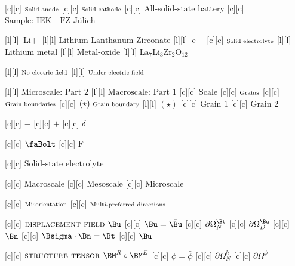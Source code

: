 [c][c] {$\text{\scriptsize Solid anode}$}
[c][c] {$\text{\scriptsize Solid cathode}$}
[c][c] {$\text{All-solid-state battery}$}
[c][c] {$\text{Sample: IEK - FZ Jülich}$}

[l][l] {$\text{Li}+$}
[l][l] {$\text{Lithium Lanthanum Zirconate}$}
[l][l] {$\text{e}-$}
[c][c] {$\text{\scriptsize Solid electrolyte}$}
[l][l] {$\text{Lithium metal}$}
[l][l] {$\text{Metal-oxide}$}
[l][l] {$\text{La}_{7}\text{Li}_{3}\text{Zr}_{2}\text{O}_{12}$}

[l][l] {$\text{\scriptsize  No electric field}$}
[l][l] {$\text{\scriptsize  Under electric field}$}

[l][l] {$\text{Microscale: Part 2}$}
[l][l] {$\text{Macroscale: Part 1}$}
[c][c] {$\text{Scale}$}
[c][c] {$\text{\scriptsize Grains}$}
[c][c] {$\text{\scriptsize Grain boundaries}$}
[c][c] {$(\star)\ \text{\scriptsize Grain boundary}$}
[l][l] {$(\star)$}
[c][c] {\small $\text{Grain 1}$}
[c][c] {\small $\text{Grain 2}$}

[c][c] {$-$}
[c][c] {$+$}
[c][c] {$\delta$}

[c][c] {$\text{\faBolt}$}
[c][c] {$\text{F}$}

[c][c] {$\text{Solid-state electrolyte}$}

[c][c] {$\text{Macroscale}$}
[c][c] {$\text{Mesoscale}$}
[c][c] {$\text{Microscale}$}


[c][c] {\small $\text{\scriptsize Misorientation}$}
[c][c] {\small $\text{\scriptsize Multi-preferred directions}$}

[c][c] {\small $\textsc{displacement field } \Bu$}
[c][c] {\small$\Bu=\bar{\Bu}$}
[c][c] {\small$\partial\Omega^{\Bt}_{N}$}
[c][c] {\small$\partial\Omega^{\Bu}_{D}$}
[c][c] {\small $\Bn$}
[c][c] {\small $\Bsigma\cdot\Bn = \bar{\Bt}$}
[c][c] {\small $\Bu$}


[c][c] {\small $\textsc{structure tensor } \BM^{R} \circ \BM^{E}$}
[c][c] {\small $\phi=\bar{\phi}$}
[c][c] {\small $\partial\Omega^{h}_{N}$}
[c][c] {\small $\partial\Omega^{\phi}$}

